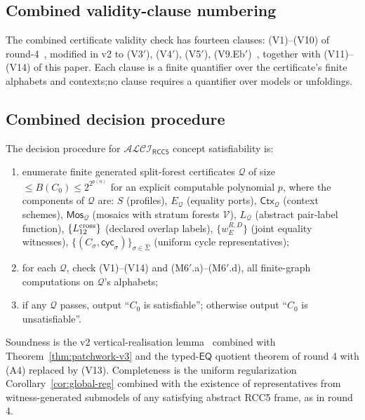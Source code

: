 \documentclass[11pt]{article}
\theoremstyle{definition}
\theoremstyle{remark}
\newcommand{\EQ}{\mathsf{EQ}}
\newcommand{\ALCIRCC}[1]{\mathcal{ALCI}_{\mathsf{RCC#1}}}
\newcommand{\Mos}{\mathsf{Mos}}
\newcommand{\Ctx}{\mathsf{Ctx}}
\newcommand{\Q}{\mathcal{Q}}
\newcommand{\extSigma}{\widehat\Sigma}
\begin{document}
\subsection{Combined validity-clause numbering}

The combined certificate validity check has fourteen clauses:
(V1)--(V10) of round-4~\cite{GPT55Repaired}, modified in v2 to
(V3$'$), (V4$'$), (V5$'$), (V9.Eb$'$)~\cite{V2Delta}, together with
(V11)--(V14) of this paper.  Each clause is a finite quantifier
over the certificate's finite alphabets and contexts;\@ no clause
requires a quantifier over models or unfoldings.

\subsection{Combined decision procedure}

The decision procedure for $\ALCIRCC{5}$ concept satisfiability is:
\begin{enumerate}[label=(\arabic*)]
\item enumerate finite generated split-forest certificates $\Q$ of
size $\leq B(C_0)\leq 2^{2^{p(n)}}$ for an explicit computable
polynomial $p$, where the components of $\Q$ are:
$S$ (profiles), $E_\Q$ (equality ports), $\Ctx_\Q$ (context
schemes), $\Mos_\Q$ (mosaics with stratum forests $\mathcal V$),
$L_\Q$ (abstract pair-label function),
$\{L_{12}^{\rm cross}\}$ (declared overlap labels),
$\{w_E^{R,D}\}$ (joint equality witnesses),
$\{(C_\sigma,\mathsf{cyc}_\sigma)\}_{\sigma\in\extSigma}$ (uniform
cycle representatives);
\item for each $\Q$, check (V1)--(V14) and (M6$'$.a)--(M6$'$.d), all
finite-graph computations on $\Q$'s alphabets;\@
\item if any $\Q$ passes, output ``$C_0$ is satisfiable'';
otherwise output ``$C_0$ is unsatisfiable''.
\end{enumerate}
Soundness is the v2 vertical-realisation
lemma~\cite{V2Delta} combined with Theorem~\ref{thm:patchwork-v3}
and the typed-$\EQ$ quotient theorem of round 4 with (A4) replaced
by (V13).  Completeness is the uniform regularization
Corollary~\ref{cor:global-reg} combined with the existence of
representatives from witness-generated submodels of any
satisfying abstract RCC5 frame, as in round 4.
\end{document}
